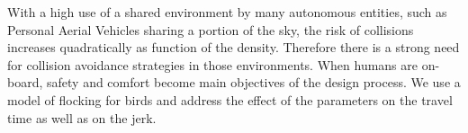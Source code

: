With a high use of a shared environment by many autonomous entities, such as Personal Aerial Vehicles sharing a portion of the sky, the risk of collisions increases quadratically as function of the density. Therefore there is a strong need for collision avoidance strategies in those environments. When humans are on-board, safety and comfort become main objectives of the design process. We use a model of flocking for birds and address the effect of the parameters on the travel time as well as on the jerk. 